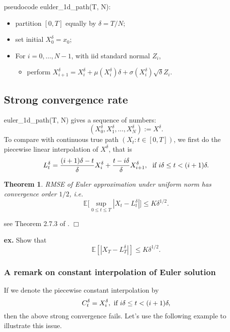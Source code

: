 \documentclass{article}
\newtheorem{theorem}{Theorem}
\newenvironment{proof}{\noindent {\sc Proof:}}{$\Box$} %
\begin{document}
pseudocode eulder\_1d\_path(T, N):
\begin{itemize}
 \item partition $[0, T]$ equally by $\delta = T/N$;
 \item set initial $X_{0}^{\delta} = x_{0}$;
 \item For $i = 0, \ldots, N-1$,  with iid standard normal $Z_{i}$, 
\begin{itemize}
 \item perform $X_{i+1}^{\delta} = X_{i}^{\delta} + \mu(X_{i}^{\delta}) \delta + 
 \sigma(X_{i}^{\delta}) \sqrt \delta Z_{i}.$
\end{itemize}

\end{itemize}


\subsection{Strong convergence rate}

euler\_1d\_path(T, N) gives a sequence of numbers:
$$(X_{0}^{\delta}, X_{1}^{\delta}, \ldots, X_{N}^{\delta}) := X^{\delta}.$$
To compare with continuous true path $(X_{t}: t\in [0,T])$, we first do the piecewise linear interpolation of $X^{\delta}$, that is
$$L^{\delta}_{t} = \frac{(i+1)\delta - t}{\delta} X_{i}^{\delta} 
+ \frac{t - i\delta}{\delta} X_{i+1}^{\delta}, \ \hbox{ if } 
i\delta \le t < (i+1)\delta.$$

\begin{theorem}
 RMSE of Euler approximation 
 under uniform norm has convergence order $1/2$, i.e.
 $$\mathbb E \Big [\sup_{0 \le t\le T} |X_{t} - L_{t}^{\delta}| \Big] \le K \delta^{1/2}.$$
\end{theorem}
\begin{proof}
 see Theorem 2.7.3 of \cite{Mao07}.
\end{proof}

{\bf ex.} Show that 
$$\mathbb E [ |X_{T} - L_{T}^{\delta} | ] \le K \delta^{1/2}.$$

\subsubsection{A remark on constant interpolation of Euler solution}
If we denote the piecewise constant interpolation by
$$C_{t}^{\delta} = 
X_{i}^{\delta}, \hbox{ if } i\delta \le t < (i+1) \delta, $$
then the above strong convergence fails. Let's use the following example to illustrate this issue.
\end{document}
